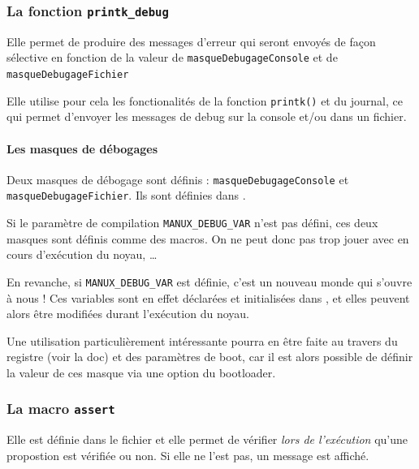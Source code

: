 %
\subsubsection{La fonction {\tt printk\_debug}}

   Elle permet de produire des messages d'erreur qui seront envoyés de
façon sélective en fonction de la valeur de \lstinline!masqueDebugageConsole!
et de \lstinline!masqueDebugageFichier!

   Elle utilise pour cela les fonctionalités de la fonction
\lstinline!printk()! et du journal, ce qui permet d'envoyer les
messages de debug sur la console et/ou dans un fichier.

%
%
%
\paragraph{Les masques de débogages}

   Deux masques de débogage sont définis : \lstinline!masqueDebugageConsole! et
\lstinline!masqueDebugageFichier!. Ils sont définies dans
.

   Si le paramètre de compilation \lstinline!MANUX_DEBUG_VAR! n'est
pas défini, ces deux masques sont définis comme des macros. On ne peut
donc pas trop jouer avec en cours d'exécution du noyau, \ldots

   En revanche, si \lstinline!MANUX_DEBUG_VAR! est définie, c'est un
nouveau monde qui s'ouvre à nous ! Ces variables sont en effet
déclarées et initialisées dans , et elles
peuvent alors être modifiées durant l'exécution du noyau.

   Une utilisation particulièrement intéressante pourra en être faite
au travers du registre (voir la doc) et des paramètres de boot, car il
est alors possible de définir la valeur de ces masque via une option
du bootloader.

%
\subsubsection{La macro {\tt assert}}

   Elle est définie dans le fichier 
et elle permet de vérifier {\em lors de l'exécution} qu'une propostion
est vérifiée ou non. Si elle ne l'est pas, un message est affiché.

